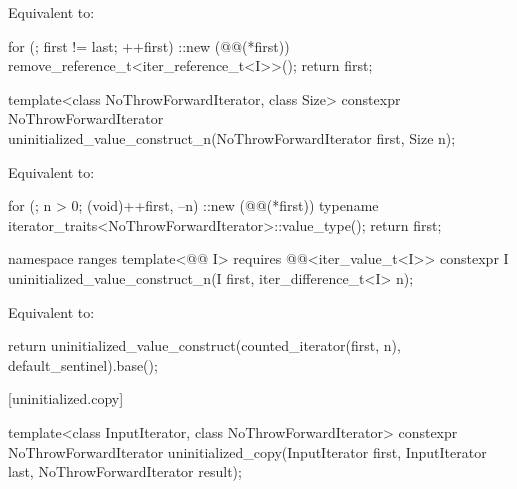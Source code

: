\begin{itemdescr}
\pnum
\effects
Equivalent to:
\begin{codeblock}
for (; first != last; ++first)
  ::new (@@(*first)) remove_reference_t<iter_reference_t<I>>();
return first;
\end{codeblock}
\end{itemdescr}

%
\begin{itemdecl}
template<class NoThrowForwardIterator, class Size>
  constexpr NoThrowForwardIterator
    uninitialized_value_construct_n(NoThrowForwardIterator first, Size n);
\end{itemdecl}

\begin{itemdescr}
\pnum
\effects
Equivalent to:
\begin{codeblock}
for (; n > 0; (void)++first, --n)
  ::new (@@(*first))
    typename iterator_traits<NoThrowForwardIterator>::value_type();
return first;
\end{codeblock}
\end{itemdescr}

%
\begin{itemdecl}
namespace ranges {
  template<@@ I>
    requires @@<iter_value_t<I>>
    constexpr I uninitialized_value_construct_n(I first, iter_difference_t<I> n);
}
\end{itemdecl}

\begin{itemdescr}
\pnum
\effects
Equivalent to:
\begin{codeblock}
return uninitialized_value_construct(counted_iterator(first, n),
                                     default_sentinel).base();
\end{codeblock}
\end{itemdescr}

[uninitialized.copy]{}

%
\begin{itemdecl}
template<class InputIterator, class NoThrowForwardIterator>
  constexpr NoThrowForwardIterator uninitialized_copy(InputIterator first, InputIterator last,
                                                      NoThrowForwardIterator result);
\end{itemdecl}

